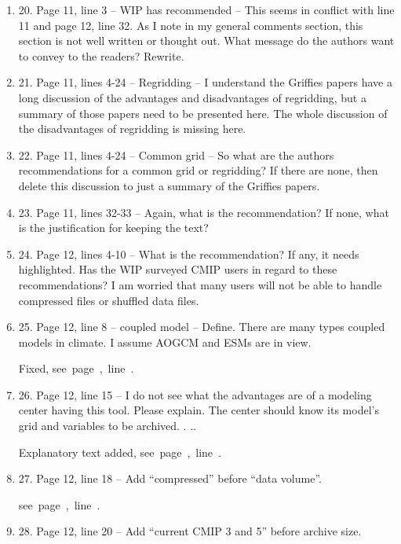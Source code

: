 \documentclass[gmd,manuscript]{copernicus}
\newcommand{\plref}[1]{\mbox{see page \pageref{p-#1}, line
    \lineref{l-#1}.}}
\newenvironment{answer}{\color{blue}}{}
\begin{document}
\begin{enumerate}[label=RC1-\arabic*,leftmargin=*]
  \begin{answer}
    Fixed, \plref{RC1-19}
  \end{answer}
\item 20. Page 11, line 3 -- WIP has recommended -- This seems in
  conflict with line 11 and page 12, line 32. As I note in my general
  comments section, this section is not well written or thought out.
  What message do the authors want to convey to the readers? Rewrite.
\item 21. Page 11, lines 4-24 -- Regridding -- I understand the Griffies
  papers have a long discussion of the advantages and disadvantages of
  regridding, but a summary of those papers need to be presented here.
  The whole discussion of the disadvantages of regridding is missing
  here.
\item 22. Page 11, lines 4-24 -- Common grid -- So what are the authors
  recommendations for a common grid or regridding? If there are none,
  then delete this discussion to just a summary of the Griffies
  papers.
\item 23. Page 11, lines 32-33 -- Again, what is the recommendation? If
  none, what is the justification for keeping the text?
\item 24. Page 12, lines 4-10 -- What is the recommendation? If any, it
  needs highlighted. Has the WIP surveyed CMIP users in regard to
  these recommendations? I am worried that many users will not be able
  to handle compressed files or shuffled data files.
\item 25. Page 12, line 8 -- coupled model -- Define. There are many
  types coupled models in climate. I assume AOGCM and ESMs are in
  view.

  \begin{answer}
    Fixed, \plref{RC1-25}
  \end{answer}
\item 26. Page 12, line 15 -- I do not see what the advantages are of a
  modeling center having this tool. Please explain. The center should
  know its model’s grid and variables to be archived. . ..

  \begin{answer}
    Explanatory text added, \plref{RC1-26} 
  \end{answer}
\item 27. Page 12, line 18 -- Add “compressed” before “data volume”.

  \begin{answer}
    \plref{RC1-27}
  \end{answer}
\item 28. Page 12, line 20 -- Add “current CMIP 3 and 5” before archive
  size.


\end{enumerate}
\end{document}

